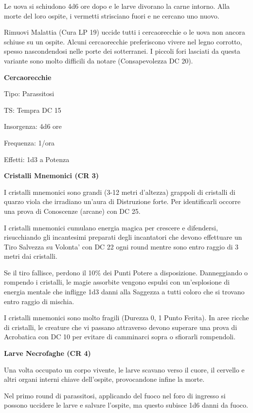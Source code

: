 \documentclass[a4paper,11pt,twoside,openany]{dndbook}
\begin{document}
{Le uova si schiudono 4d6 ore dopo e le larve divorano la carne intorno. Alla morte del loro ospite, i vermetti strisciano fuori e ne cercano uno nuovo.

Rimuovi Malattia (Cura LP 19) uccide tutti i cercaorecchie o le uova non ancora schiuse su un ospite. Alcuni cercaorecchie preferiscono vivere nel legno corrotto, spesso nascondendosi nelle porte dei sotterranei. I piccoli fori lasciati da questa variante sono molto difficili da notare (Consapevolezza DC 20).

\textbf{Cercaorecchie}

Tipo: Parassitosi

TS: Tempra DC 15

Insorgenza: 4d6 ore

Frequenza: 1/ora

Effetti: 1d3 a Potenza

\textbf{Cristalli Mnemonici (CR 3)}

I cristalli mnemonici sono grandi (3-12 metri d'altezza) grappoli di cristalli di quarzo viola che irradiano un'aura di Distruzione forte. Per identificarli occorre una prova di Conoscenze (arcane) con DC 25.

I cristalli mnemonici cumulano energia magica per crescere e difendersi, risucchiando gli incantesimi preparati degli incantatori che devono effettuare un Tiro Salvezza su Volonta' con DC 22 ogni round mentre sono entro raggio di 3 metri dai cristalli.

Se il tiro fallisce, perdono il 10\% dei Punti Potere a disposizione. Danneggiando o rompendo i cristalli, le magie assorbite vengono espulsi con un'esplosione di energia mentale che infligge 1d3 danni alla Saggezza a tutti coloro che si trovano entro raggio di mischia.

I cristalli mnemonici sono molto fragili (Durezza 0, 1 Punto Ferita).
In aree ricche di cristalli, le creature che vi passano attraverso devono superare una prova di Acrobatica con DC 10 per evitare di camminarci sopra o sfiorarli rompendoli.

\textbf{Larve Necrofaghe (CR 4)}

Una volta occupato un corpo vivente, le larve scavano verso il cuore, il cervello e altri organi interni chiave dell'ospite, provocandone infine la morte.

Nel primo round di parassitosi, applicando del fuoco nel foro di ingresso si possono uccidere le larve e salvare l'ospite, ma questo subisce 1d6 danni da fuoco. 

}
\end{document}
